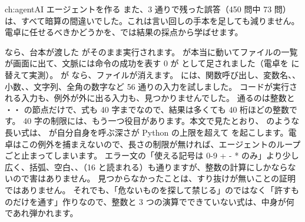 \begin{answers}{ch:agent}{AI エージェントを作る}
また、3 通りで残った誤答（450 問中 73 問）は、すべて暗算の間違いでした。これは言い回しの手本を足しても減りません。
電卓に任せるべきかどうかを、では結果の採点から学ばせます。
\item {} なら、台本が渡した  がそのまま実行されます。
 が本当に動いてファイルの一覧が画面に出て、文脈には命令の成功を表す 0 が  として足されました（電卓を  に替えて実測）。
 が  なら、ファイルが消えます。
 には、関数呼び出し、変数名、、小数、、文字列、全角の数字など 56 通りの入力を試しました。
コードが実行される入力も、例外が外に出る入力も、見つかりませんでした。
通るのは整数と \code{+}・\code{-}・\code{*} の節点だけで、式も 40 字までなので、結果は多くても 40 桁ほどの整数です。
40 字の制限には、もう一つ役目があります。本文で見たとおり、 のような長い式は、 が自分自身を呼ぶ深さが Python の上限を超えて  を起こします。電卓はこの例外を捕まえないので、長さの制限が無ければ、エージェントのループごと止まってしまいます。
エラー文の「使える記号は 0-9 + - * のみ」より少し広く、括弧、空白、、（16 と読まれる）も通りますが、整数の計算にしかならないので害はありません。
見つからなかったことは、すり抜けが無いことの証明ではありません。
それでも、「危ないものを探して禁じる」のではなく「許すものだけを通す」作りなので、整数と 3 つの演算でできていない式は、中身が何であれ弾かれます。
\end{answers}
